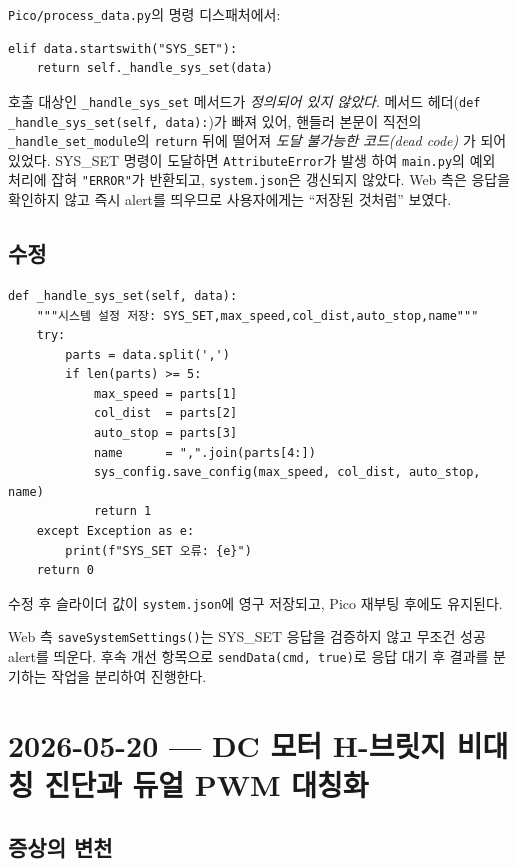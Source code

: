 \documentclass[11pt, oneside]{article}
\begin{document}
\texttt{Pico/process\_data.py}의 명령 디스패처에서:

\begin{verbatim}
elif data.startswith("SYS_SET"):
    return self._handle_sys_set(data)
\end{verbatim}

호출 대상인 \texttt{\_handle\_sys\_set} 메서드가 \emph{정의되어 있지
않았다}. 메서드 헤더(\texttt{def \_handle\_sys\_set(self, data):})가
빠져 있어, 핸들러 본문이 직전의 \texttt{\_handle\_set\_module}의
\texttt{return} 뒤에 떨어져 \emph{도달 불가능한 코드(dead code)} 가
되어 있었다. SYS\_SET 명령이 도달하면 \texttt{AttributeError}가 발생
하여 \texttt{main.py}의 예외 처리에 잡혀 \texttt{"ERROR"}가 반환되고,
\texttt{system.json}은 갱신되지 않았다. Web 측은 응답을 확인하지 않고
즉시 alert를 띄우므로 사용자에게는 ``저장된 것처럼'' 보였다.

\subsection{수정}

\begin{verbatim}
def _handle_sys_set(self, data):
    """시스템 설정 저장: SYS_SET,max_speed,col_dist,auto_stop,name"""
    try:
        parts = data.split(',')
        if len(parts) >= 5:
            max_speed = parts[1]
            col_dist  = parts[2]
            auto_stop = parts[3]
            name      = ",".join(parts[4:])
            sys_config.save_config(max_speed, col_dist, auto_stop, name)
            return 1
    except Exception as e:
        print(f"SYS_SET 오류: {e}")
    return 0
\end{verbatim}

수정 후 슬라이더 값이 \texttt{system.json}에 영구 저장되고, Pico 재부팅
후에도 유지된다.

\begin{caution}
Web 측 \texttt{saveSystemSettings()}는 SYS\_SET 응답을 검증하지 않고
무조건 성공 alert를 띄운다. 후속 개선 항목으로 \texttt{sendData(cmd,
true)}로 응답 대기 후 결과를 분기하는 작업을 분리하여 진행한다.
\end{caution}

\section{2026-05-20 --- DC 모터 H-브릿지 비대칭 진단과 듀얼 PWM 대칭화}

\subsection{증상의 변천}
\end{document}
